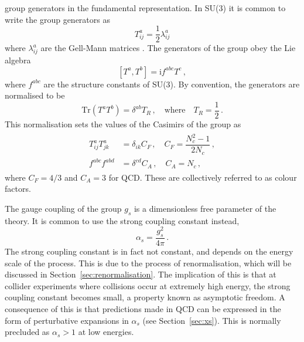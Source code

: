 \documentclass[main.tex]{subfiles}
\begin{document}
    group generators in the fundamental representation. In SU(3) it is
    common to write the group generators as
    \begin{equation}\label{eqn:group_generators}
        T^{a}_{ij} = \dfrac{1}{2}\lambda^{a}_{ij}
    \end{equation}
    where $\lambda^{a}_{ij}$ are the Gell-Mann matrices \cite{Gell-Mann:1962yej}.
    The generators of the group obey the Lie algebra
    \begin{equation}\label{eqn:lie_algebra}
        [T^{a}, T^{b}] = \mathrm{i}f^{abc}T^{c} \, ,
    \end{equation}
    where $f^{abc}$ are the structure constants of SU(3).
    By convention, the generators are normalised to be
    \begin{equation}\label{eqn:generator_normalisation}
        \mathrm{Tr}(T^{a}T^{b}) = \delta^{ab}T_{R} \, , \quad \mathrm{where} \quad T_{R} = \dfrac{1}{2} \, .
    \end{equation}
    This normalisation sets the values of the Casimirs
    of the group as
    \begin{align}\label{eqn:casimirs}
        \begin{split}
            T^{a}_{ij}T^{a}_{jk} &= \delta_{ik}C_{F} \, , \quad C_{F} = \dfrac{N_{c}^2-1}{2N_{c}} \, , \\
            f^{abc}f^{abd} &= \delta^{cd}C_{A} \, , \quad C_{A} = N_{c} \, ,
        \end{split}
    \end{align}
    where $C_{F}=4/3$ and $C_{A}=3$ for QCD.
    These are collectively referred to as colour factors.

    The gauge coupling of the group $g_{s}$
    is a dimensionless free parameter of the theory.
    It is common to use the strong coupling constant
    instead, 
    \begin{equation}\label{eqn:alpha_s}
        \alpha_{s} = \dfrac{g_{s}^{2}}{4\pi} \, .
    \end{equation}
    The strong coupling constant is in fact not constant, and
    depends on the energy scale of the process. This
    is due to the process of renormalisation, which will be discussed
    in Section~\ref{sec:renormalisation}.
    The implication of this is that at collider
    experiments where collisions occur at extremely high energy,
    the strong coupling constant becomes small, a
    property known as asymptotic freedom. A consequence
    of this is that predictions made in QCD can be expressed
    in the form of perturbative expansions in $\alpha_{s}$ (see Section~\ref{sec:xs}).
    This is normally precluded as $\alpha_{s} > 1$ at low
    energies.
\end{document}
